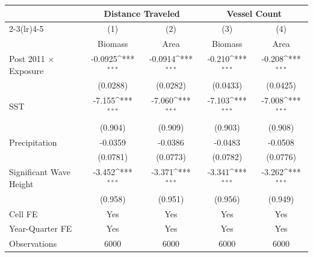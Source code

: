 {
\def\sym#1{\ifmmode^{#1}\else\(^{#1}\)\fi}
\begin{tabular}{l*{4}{c}}
\hline\hline
                    &\multicolumn{2}{c}{Distance Traveled} &\multicolumn{2}{c}{Vessel Count}           \\\cmidrule(lr){2-3}\cmidrule(lr){4-5}
                    &\multicolumn{1}{c}{(1)}&\multicolumn{1}{c}{(2)}&\multicolumn{1}{c}{(3)}&\multicolumn{1}{c}{(4)}\\
                    &\multicolumn{1}{c}{Biomass}&\multicolumn{1}{c}{Area}&\multicolumn{1}{c}{Biomass}&\multicolumn{1}{c}{Area}\\
\hline
Post 2011 $\times$ Exposure&     -0.0925\sym{***}&     -0.0914\sym{***}&      -0.210\sym{***}&      -0.208\sym{***}\\
                    &    (0.0288)         &    (0.0282)         &    (0.0433)         &    (0.0425)         \\
[1em]
SST                 &      -7.155\sym{***}&      -7.060\sym{***}&      -7.103\sym{***}&      -7.008\sym{***}\\
                    &     (0.904)         &     (0.909)         &     (0.903)         &     (0.908)         \\
[1em]
Precipitation       &     -0.0359         &     -0.0386         &     -0.0483         &     -0.0508         \\
                    &    (0.0781)         &    (0.0773)         &    (0.0782)         &    (0.0776)         \\
[1em]
Significant Wave Height&      -3.452\sym{***}&      -3.371\sym{***}&      -3.341\sym{***}&      -3.262\sym{***}\\
                    &     (0.958)         &     (0.951)         &     (0.956)         &     (0.949)         \\
\hline
Cell FE             &         Yes         &         Yes         &         Yes         &         Yes         \\
Year-Quarter FE     &         Yes         &         Yes         &         Yes         &         Yes         \\
Observations        &        6000         &        6000         &        6000         &        6000         \\
\hline\hline
\end{tabular}
}
